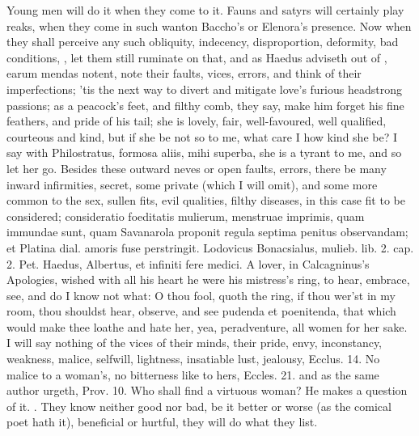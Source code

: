 Young men will do it when they come to it. Fauns and satyrs will
certainly play reaks, when they come in such wanton Baccho's or
Elenora's presence. Now when they shall perceive any such obliquity,
indecency, disproportion, deformity, bad conditions, \etc{}, let them
still ruminate on that, and as Haedus adviseth out of \Ovid, earum
mendas notent, note their faults, vices, errors, and think of their
imperfections; 'tis the next way to divert and mitigate love's furious
headstrong passions; as a peacock's feet, and filthy comb, they say,
make him forget his fine feathers, and pride of his tail; she is
lovely, fair, well-favoured, well qualified, courteous and kind, but if
she be not so to me, what care I how kind she be? I say with
Philostratus, formosa aliis, mihi superba, she is a tyrant to me,
and so let her go. Besides these outward neves or open faults, errors,
there be many inward infirmities, secret, some private (which I will
omit), and some more common to the sex, sullen fits, evil qualities,
filthy diseases, in this case fit to be considered; consideratio
foeditatis mulierum, menstruae imprimis, quam immundae sunt, quam
Savanarola proponit regula septima penitus observandam; et Platina
dial. amoris fuse perstringit. Lodovicus Bonacsialus, mulieb. lib. 2.
cap. 2. Pet. Haedus, Albertus, et infiniti fere medici. A lover,
in Calcagninus's Apologies, wished with all his heart he were his
mistress's ring, to hear, embrace, see, and do I know not what: O thou
fool, quoth the ring, if thou wer'st in my room, thou shouldst hear,
observe, and see pudenda et poenitenda, that which would make thee
loathe and hate her, yea, peradventure, all women for her sake.
I will say nothing of the vices of their minds, their pride, envy,
inconstancy, weakness, malice, selfwill, lightness, insatiable lust,
jealousy, Ecclus.  14. No malice to a woman's, no bitterness like to
hers, Eccles.  21. and as the same author urgeth, Prov.  10.
Who shall find a virtuous woman? He makes a question of it. . They know neither good nor bad, be
it better or worse (as the comical poet hath it), beneficial or
hurtful, they will do what they list.


